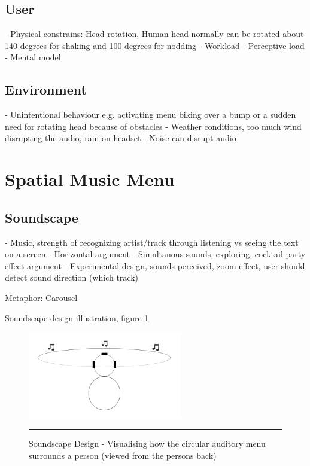\subsection{User}
- Physical constrains: Head rotation, Human head normally can be rotated about 140 degrees for shaking and 100 degrees for nodding \cite{lopresti_neck_2000}
- Workload
- Perceptive load
- Mental model

\subsection{Environment}
- Unintentional behaviour e.g. activating menu biking over a bump or a sudden need for rotating head because of obstacles
- Weather conditions, too much wind disrupting the audio, rain on headset
- Noise can disrupt audio


\section{Spatial Music Menu}

\subsection{Soundscape}
- Music, strength of recognizing artist/track through listening vs seeing the text on a screen
- Horizontal argument
- Simultanous sounds, exploring, cocktail party effect argument
- Experimental design, sounds perceived, zoom effect, user should detect sound direction (which track)

Metaphor: Carousel

Soundscape design illustration, figure \ref{fig:sounddesign}

\begin{figure}[htbp]
	\centering
		\includegraphics[width=0.6\textwidth,height=\textheight,keepaspectratio]{./Figures/sounddesign.png}
		\rule{35em}{0.5pt}
	\caption[Soundscape Design]{Soundscape Design - Visualising how the circular auditory menu surrounds a person (viewed from the persons back)}
	\label{fig:sounddesign}
\end{figure}

